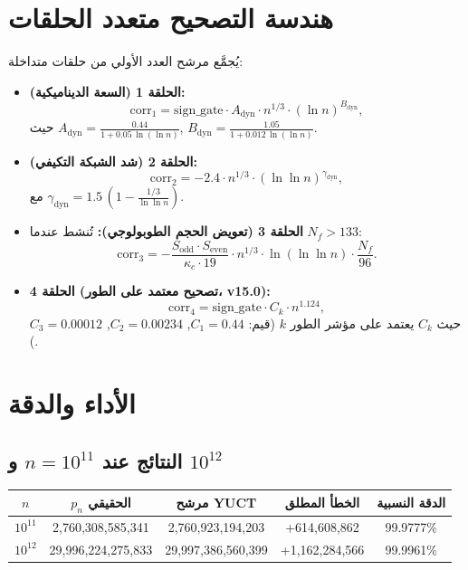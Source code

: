 \documentclass[12pt,a4paper]{article}
\newcommand{\kappac}{\kappa_c}
\newcommand{\Sodd}{S_{\mathrm{odd}}}
\newcommand{\Seven}{S_{\mathrm{even}}}
\begin{document}
	\section{هندسة التصحيح متعدد الحلقات}
	\label{sec:multiloop}
	يُجمَّع مرشح العدد الأولي من حلقات متداخلة:
	\begin{itemize}
		\item \textbf{الحلقة 1 (السعة الديناميكية):}
		\[
		\mathrm{corr}_1 = \mathrm{sign\_gate} \cdot A_{\mathrm{dyn}} \cdot n^{1/3} \cdot (\ln n)^{B_{\mathrm{dyn}}},
		\]
		حيث \(A_{\mathrm{dyn}} = \frac{0.44}{1 + 0.05\,\ln(\ln n)}\), \(B_{\mathrm{dyn}} = \frac{1.05}{1 + 0.012\,\ln(\ln n)}\).
		\item \textbf{الحلقة 2 (شد الشبكة التكيفي):}
		\[
		\mathrm{corr}_2 = -2.4 \cdot n^{1/3} \cdot (\ln\ln n)^{\gamma_{\mathrm{dyn}}},
		\]
		مع \(\gamma_{\mathrm{dyn}} = 1.5\,(1 - \frac{1/3}{\ln\ln n})\).
		\item \textbf{الحلقة 3 (تعويض الحجم الطوبولوجي):} تُنشط عندما \(N_f > 133\):
		\[
		\mathrm{corr}_3 = -\frac{\Sodd\cdot\Seven}{\kappac\cdot 19} \cdot n^{1/3} \cdot \ln(\ln\ln n) \cdot \frac{N_f}{96}.
		\]
		\item \textbf{الحلقة 4 (تصحيح معتمد على الطور، v15.0):}
		\[
		\mathrm{corr}_4 = \mathrm{sign\_gate} \cdot C_k \cdot n^{1.124},
		\]
		حيث \(C_k\) يعتمد على مؤشر الطور \(k\) (قيم: \(C_1=0.44\), \(C_2=0.00234\), \(C_3=0.00012\)).
	\end{itemize}
	
	\section{الأداء والدقة}
	\subsection{النتائج عند \(n=10^{11}\) و \(10^{12}\)}
	\begin{center}
		\begin{tabular}{c c c c c}
			\toprule
			$n$ & $p_n$ الحقيقي & مرشح YUCT & الخطأ المطلق & الدقة النسبية \\
			\midrule
			$10^{11}$ & 2,760,308,585,341 & 2,760,923,194,203 & +614,608,862 & 99.9777\% \\
			$10^{12}$ & 29,996,224,275,833 & 29,997,386,560,399 & +1,162,284,566 & 99.9961\% \\
			\bottomrule
		\end{tabular}
	\end{center}
	
\end{document}
